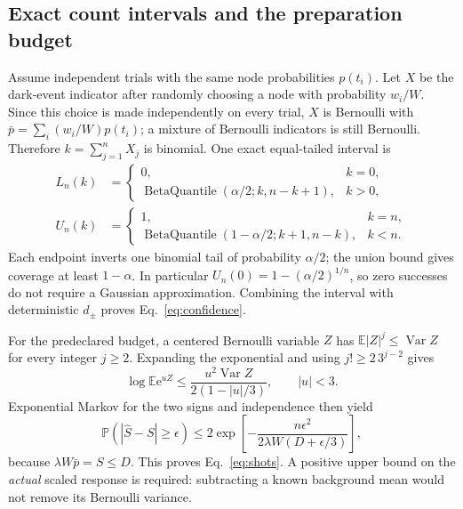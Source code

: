 \documentclass[aps,pra,reprint,superscriptaddress,longbibliography]{revtex4-2}
\newcommand{\ee}{\mathrm e}
\newcommand{\Var}{\operatorname{Var}}
\begin{document}
\subsection{Exact count intervals and the preparation budget}

Assume independent trials with the same node probabilities $p(t_i)$.
Let $X$ be the dark-event indicator after randomly choosing a node
with probability $w_i/W$. Since this choice is made independently
on every trial, $X$ is Bernoulli with
$\bar p=\sum_i(w_i/W)p(t_i)$; a mixture of Bernoulli indicators is
still Bernoulli. Therefore $k=\sum_{j=1}^nX_j$ is binomial.
One exact equal-tailed interval \cite{ClopperPearson} is
\begin{align}
 L_n(k)&=\begin{cases}
 0,&k=0,\\
 \operatorname{BetaQuantile}(\alpha/2;k,n-k+1),&k>0,
 \end{cases}\nonumber\\
 U_n(k)&=\begin{cases}
 1,&k=n,\\
 \operatorname{BetaQuantile}(1-\alpha/2;k+1,n-k),&k<n.
 \end{cases}                                                  \label{eq:cp}
\end{align}
Each endpoint inverts one binomial tail of probability $\alpha/2$;
the union bound gives coverage at least $1-\alpha$. In particular
$U_n(0)=1-(\alpha/2)^{1/n}$, so zero successes do not require a
Gaussian approximation. Combining the interval with deterministic
$d_\pm$ proves Eq.~\eqref{eq:confidence}.

For the predeclared budget, a centered Bernoulli variable $Z$ has
$\mathbb E|Z|^j\le\Var Z$ for every integer $j\ge2$. Expanding
the exponential and using $j!\ge2\,3^{j-2}$ gives
\begin{equation}
 \log\mathbb E\ee^{uZ}\le
       \frac{u^2\Var Z}{2(1-|u|/3)},\qquad |u|<3.
\end{equation}
Exponential Markov for the two signs and independence then yield
\begin{equation}
 \mathbb P(|\widehat S-S|\ge\epsilon)
 \le2\exp\left[-\frac{n\epsilon^2}
                   {2\lambda W(D+\epsilon/3)}\right],
                                                               \label{eq:bernstein}
\end{equation}
because $\lambda W\bar p=S\le D$.
This proves Eq.~\eqref{eq:shots}. A positive upper bound on the
\emph{actual} scaled response is required: subtracting a known
background mean would not remove its Bernoulli variance.
\end{document}
